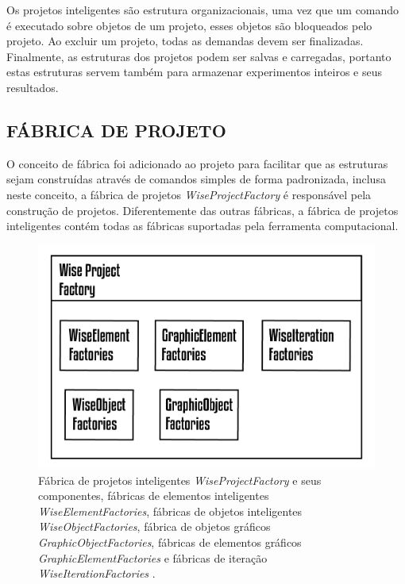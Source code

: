 \documentclass[a4paper,12pt]{monografia}
\theoremstyle{plain}
\theoremstyle{definition}
\theoremstyle{remark}
\begin{document}
Os projetos inteligentes são estrutura organizacionais, uma vez que um comando é executado sobre objetos de um projeto, esses objetos são bloqueados pelo projeto. Ao excluir um projeto, todas as demandas devem ser finalizadas. Finalmente, as estruturas dos projetos podem ser salvas e carregadas, portanto estas estruturas servem também para armazenar experimentos inteiros e seus resultados.

\subsection{FÁBRICA DE PROJETO}\label{sec:fabrica_projeto} 

O conceito de fábrica foi adicionado ao projeto para facilitar que as estruturas sejam construídas através de comandos simples de forma padronizada, inclusa neste conceito, a fábrica de projetos \textit{WiseProjectFactory} é responsável pela construção de projetos. Diferentemente das outras fábricas, a fábrica de projetos inteligentes contém todas as fábricas suportadas pela ferramenta computacional.

\begin{figure}[!htbp]
	\centering
	\includegraphics[scale=1]{Figures/WiseProjectFactory.png}
	\caption{Fábrica de projetos inteligentes \textit{WiseProjectFactory} e seus componentes, fábricas de elementos inteligentes \textit{WiseElementFactories}, fábricas de objetos inteligentes \textit{WiseObjectFactories}, fábrica de objetos gráficos \textit{GraphicObjectFactories}, fábricas de elementos gráficos \textit{GraphicElementFactories} e fábricas de iteração \textit{WiseIterationFactories} .}
	\label{fig7:projectfactory}
\end{figure}
\end{document}
